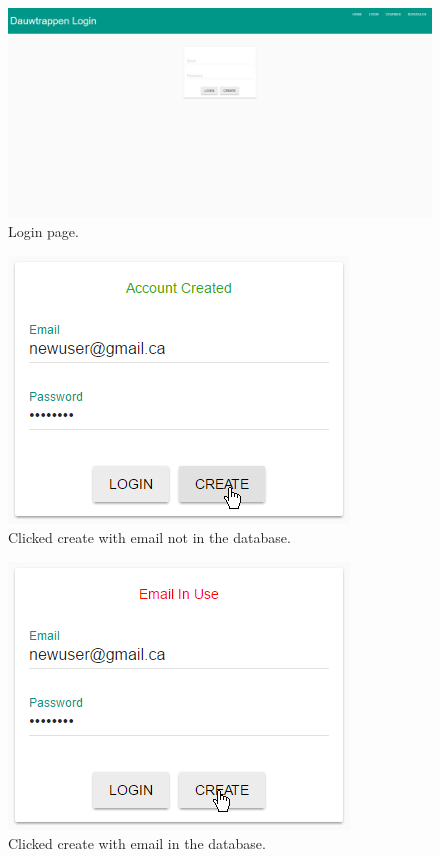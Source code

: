 \documentclass[twoside=false,a4paper,11pt]{article}
\theoremstyle{mytheor}
\begin{document}
\begin{figure}[h!]
	\includegraphics[width=\textwidth]{loginBlank.png} 
	\caption{Login page.}
\end{figure}
\begin{figure}[h!]
	\includegraphics{loginNewAccount.png}
	\caption{Clicked create with email not in the database.}
\end{figure}
\begin{figure}[h!]
	\includegraphics{loginExistingAccount.png}
	\caption{Clicked create with email in the database.}
\end{figure}
\end{document}
